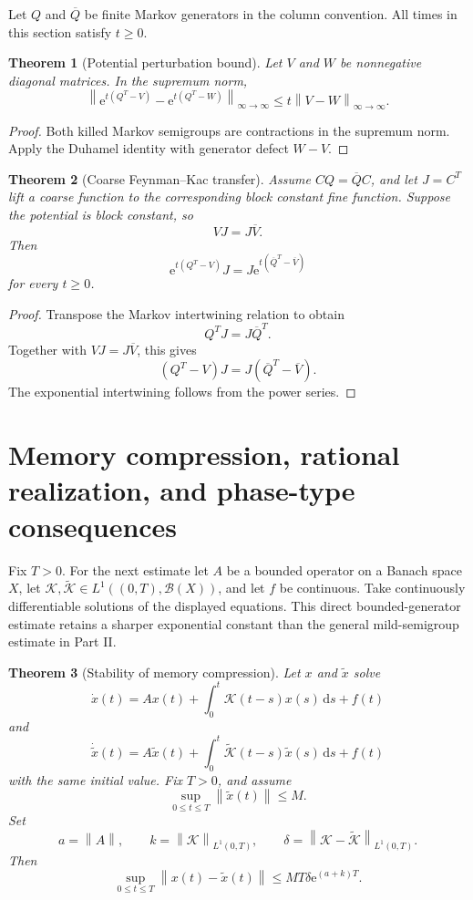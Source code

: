 \documentclass[11pt,letterpaper]{article}
\newtheorem{theorem}{Theorem}[section]
\theoremstyle{plain}
\theoremstyle{plain}
\theoremstyle{plain}
\theoremstyle{definition}
\theoremstyle{definition}
\theoremstyle{definition}
\theoremstyle{definition}
\theoremstyle{definition}
\theoremstyle{remark}
\theoremstyle{remark}
\theoremstyle{remark}
\theoremstyle{remark}
\theoremstyle{remark}
\newcommand{\norm}[1]{\left\lVert#1\right\rVert}
\theoremstyle{remark}
\newcommand{\Kcal}{\mathcal K}
\newcommand{\e}{\mathrm e}
\newcommand{\dd}{\,\mathrm d}
\let\KomorebiPrimitiveMathcal\mathcal
\renewcommand{\mathcal}[1]{{\KomorebiPrimitiveMathcal{#1}}}
\let\KomorebiPrimitivemathrm\mathrm
\renewcommand{\mathrm}[1]{{\KomorebiPrimitivemathrm{#1}}}
\begin{document}
Let $Q$ and $\overline Q$ be finite Markov generators in the column convention. All times in this section satisfy $t\geq0$.
\begin{theorem}[Potential perturbation bound]\label{earlier:record:019}\label{earlier:thm:feynman_kac_potential_bound}
Let \(V\) and \(W\) be nonnegative diagonal matrices. In the supremum norm,
\[
\boxed{
\norm{
\e^{t(Q^T-V)}
-
\e^{t(Q^T-W)}
}_{\infty\to\infty}
\leq
 t\norm{V-W}_{\infty\to\infty}.
}
\]
\end{theorem}

\begin{proof}
Both killed Markov semigroups are contractions in the supremum norm. Apply the Duhamel identity with generator defect \(W-V\).
\end{proof}

\begin{theorem}[Coarse Feynman--Kac transfer]\label{earlier:record:020}\label{earlier:thm:coarse_feynman_kac}
Assume \(CQ=\overline QC\), and let \(J=C^T\) lift a coarse function to the corresponding block constant fine function. Suppose the potential is block constant, so
\[
VJ=J\overline V.
\]
Then
\[
\boxed{
\e^{t(Q^T-V)}J
=
J\e^{t(\overline Q^T-\overline V)}
}
\]
for every \(t\geq0\).
\end{theorem}

\begin{proof}
Transpose the Markov intertwining relation to obtain
\[
Q^TJ=J\overline Q^T.
\]
Together with \(VJ=J\overline V\), this gives
\[
(Q^T-V)J=J(\overline Q^T-\overline V).
\]
The exponential intertwining follows from the power series.
\end{proof}


\FloatBarrier
\section{Memory compression, rational realization, and phase-type consequences}\label{earlier:section:05}
Fix $T>0$. For the next estimate let $A$ be a bounded operator on a Banach space $X$, let $\Kcal,\widetilde\Kcal\in L^1((0,T),\mathcal B(X))$, and let $f$ be continuous. Take continuously differentiable solutions of the displayed equations. This direct bounded-generator estimate retains a sharper exponential constant than the general mild-semigroup estimate in Part II.
\begin{theorem}[Stability of memory compression]\label{earlier:record:021}\label{earlier:thm:memory_compression_stability}
Let \(x\) and \(\widetilde x\) solve
\[
\dot x(t)
=Ax(t)+\int_0^t\Kcal(t-s)x(s)\dd s+f(t)
\]
and
\[
\dot{\widetilde x}(t)
=A\widetilde x(t)
+\int_0^t\widetilde\Kcal(t-s)\widetilde x(s)\dd s
+f(t)
\]
with the same initial value. Fix \(T>0\), and assume
\[
\sup_{0\leq t\leq T}\norm{\widetilde x(t)}\leq M.
\]
Set
\[
a=\norm A,
\qquad
k=\norm{\Kcal}_{L^1(0,T)},
\qquad
\delta=\norm{\Kcal-\widetilde\Kcal}_{L^1(0,T)}.
\]
Then
\[
\boxed{
\sup_{0\leq t\leq T}
\norm{x(t)-\widetilde x(t)}
\leq
MT\delta\e^{(a+k)T}.
}
\]
\end{theorem}
\end{document}
